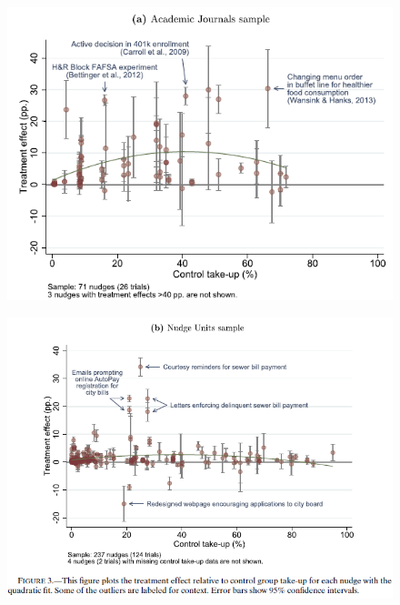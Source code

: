 \documentclass[dvipdfmx,11pt]{beamer}
\begin{document}
\begin{frame}{}
  \begin{figure}
    \centering
    \includegraphics[scale = .6]{fig_tab/os20220412/F3a}
  \end{figure}
\end{frame}

\begin{frame}{}
  \begin{figure}
    \centering
    \includegraphics[scale = .6]{fig_tab/os20220412/F3b}
  \end{figure}
\end{frame}
\end{document}
